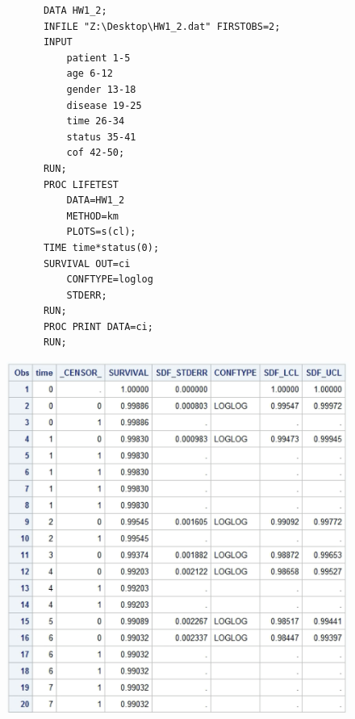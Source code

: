 \documentclass[12pt]{elegantbook}
\begin{document}
    \begin{solution}
        \begin{verbatim}
            DATA HW1_2;
            INFILE "Z:\Desktop\HW1_2.dat" FIRSTOBS=2;
            INPUT 
                patient 1-5 
                age 6-12 
                gender 13-18 
                disease 19-25
                time 26-34
                status 35-41
                cof 42-50;
            RUN;
            PROC LIFETEST 
                DATA=HW1_2 
                METHOD=km 
                PLOTS=s(cl);
            TIME time*status(0);
            SURVIVAL OUT=ci 
                CONFTYPE=loglog 
                STDERR;
            RUN;
            PROC PRINT DATA=ci;
            RUN;
        \end{verbatim}
        \begin{figure}[H]
            \centering
            \includegraphics[width=\textwidth]{HW1_3.png}
        \end{figure}
    \end{solution}
\end{document}
